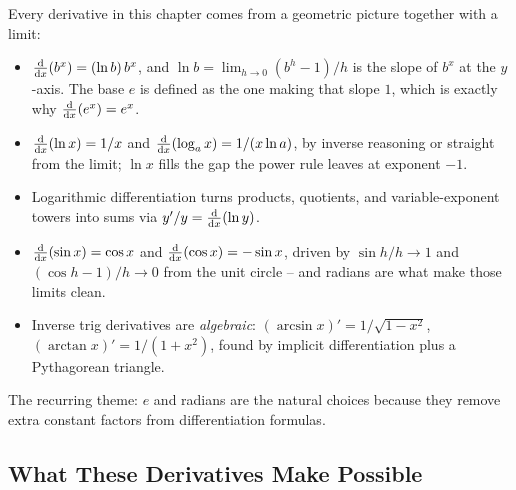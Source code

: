 Every derivative in this chapter comes from a geometric picture together with a limit:
\begin{itemize}
\item $\frac{\mathrm{d}}{\mathrm{d} x}\!\left(b^x\right) = (\ln b)\,b^x$, and $\ln b = \lim_{h\to0}(b^h-1)/h$ is the
slope of $b^x$ at the $y$-axis. The base $e$ is defined as the one making
that slope $1$, which is exactly why $\frac{\mathrm{d}}{\mathrm{d} x}\!\left(e^x\right)=e^x$.
\item $\frac{\mathrm{d}}{\mathrm{d} x}\!\left(\ln x\right)=1/x$ and $\frac{\mathrm{d}}{\mathrm{d} x}\!\left(\log_a x\right) = 1/(x\ln a)$, by inverse
reasoning or straight from the limit; $\ln x$ fills the gap the power rule
leaves at exponent $-1$.
\item Logarithmic differentiation turns products, quotients, and
variable-exponent towers into sums via $y'/y = \frac{\mathrm{d}}{\mathrm{d} x}\!\left(\ln y\right)$.
\item $\frac{\mathrm{d}}{\mathrm{d} x}\!\left(\sin x\right)=\cos x$ and $\frac{\mathrm{d}}{\mathrm{d} x}\!\left(\cos x\right)=-\sin x$, driven by
$\sin h/h\to1$ and $(\cos h-1)/h\to 0$ from the unit circle -- and radians
are what make those limits clean.
\item Inverse trig derivatives are \emph{algebraic}:
$(\arcsin x)'=1/\sqrt{1-x^2}$, $(\arctan x)'=1/(1+x^2)$, found by implicit
differentiation plus a Pythagorean triangle.
\end{itemize}
The recurring theme: $e$ and radians are the natural choices
because they remove extra constant factors from differentiation formulas.

\subsection{What These Derivatives Make Possible}
\label{ch12:what-unlocked}

